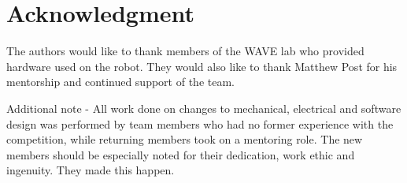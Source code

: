 \documentclass[11pt,journal]{IEEEtran}
\begin{document}
%


\section*{Acknowledgment}

The authors would like to thank members of the WAVE lab who provided hardware used on the robot. They would also like to thank Matthew Post for his mentorship and continued support of the team.

Additional note - All work done on changes to mechanical, electrical and software design was performed by team members who had no former experience with the competition, while returning members took on a mentoring role. The new members should be especially noted for their dedication, work ethic and ingenuity. They made this happen.

\ifCLASSOPTIONcaptionsoff
  \newpage
\fi




\end{document}
